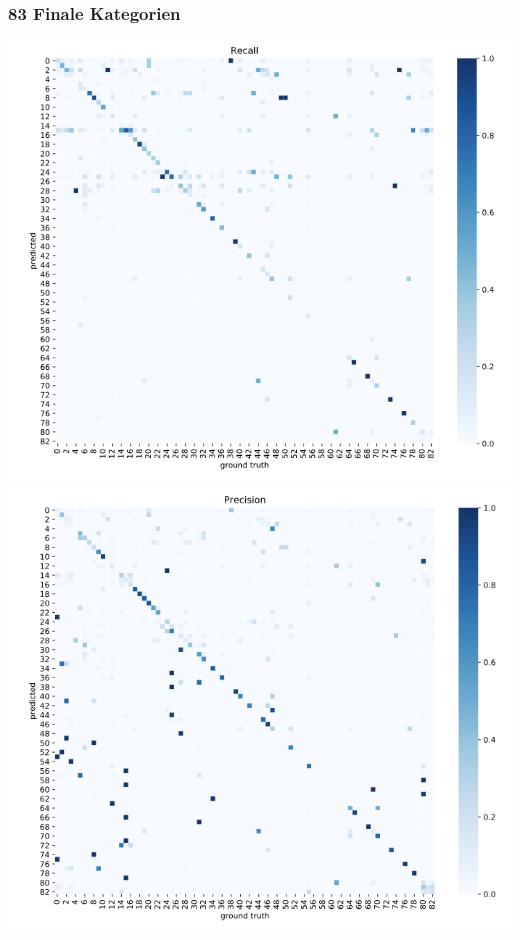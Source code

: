 \begin{frame}
\frametitle{83 Finale Kategorien}

\includegraphics[width=.49\textwidth]{images/83_confmat1}
\includegraphics[width=.49\textwidth]{images/83_confmat2}

\end{frame}

